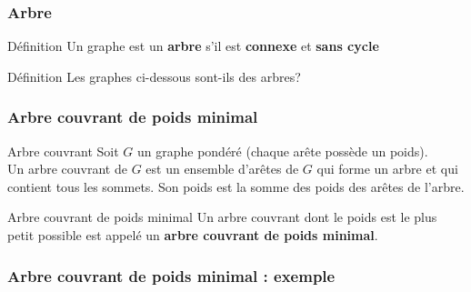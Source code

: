 \documentclass[draft]{beamer}
\begin{document}
\begin{frame}[fragile]
    \frametitle{Arbre}
    \begin{exampleblock}{Définition}
        Un graphe est un \textbf{arbre} s'il est \textbf{connexe} et \textbf{sans cycle}
    \end{exampleblock}
    \pause
    \vspace{\baselineskip}

    \begin{alertblock}{Définition}
        Les graphes ci-dessous sont-ils des arbres?
    \end{alertblock}

    \begin{figure}
        \hspace{1.5cm}
    \end{figure}
\end{frame}


\begin{frame}
    \frametitle{Arbre couvrant de poids minimal}
    \begin{exampleblock}{Arbre couvrant}
        Soit $G$ un graphe pondéré (chaque arête possède un poids).\\
        Un arbre couvrant de $G$ est un ensemble d'arêtes de $G$ qui forme un arbre et qui contient tous les sommets.
        Son poids est la somme des poids des arêtes de l'arbre.
    \end{exampleblock}
    \pause
    \vspace{\baselineskip}

    \begin{exampleblock}{Arbre couvrant de poids minimal}
        Un arbre couvrant dont le poids est le plus petit possible est appelé un \textbf{arbre couvrant de poids minimal}.
    \end{exampleblock}
\end{frame}

\begin{frame}
    \frametitle{Arbre couvrant de poids minimal : exemple}
    \begin{figure}
    \end{figure}
\end{frame}
\end{document}
